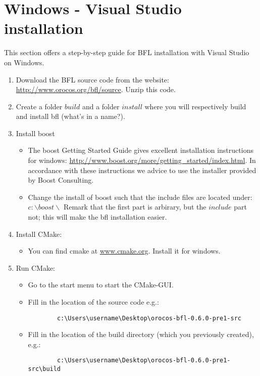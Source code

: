 \documentclass[a4paper,10pt]{article}
\begin{document}
\section{Windows - Visual Studio installation}
\label{sec:windows}
This section offers a step-by-step guide for BFL installation with Visual Studio on Windows.

\begin{enumerate}
\item Download the BFL source code from the website: 
\url{http://www.orocos.org/bfl/source}. Unzip this code.
\item Create a folder $build$ and a folder $install$ where you will respectively build and install bfl (what's in a name?).
 \item Install boost
 	\begin{itemize}
 	 \item The boost Getting Started Guide gives excellent installation instructions for windows: \url{http://www.boost.org/more/getting_started/index.html}. In accordance with these instructions we advice to use the installer provided by Boost Consulting.
 	 \item Change the install of boost such that the include files are located under: $ c:\backslash boost \backslash$
 	 Remark that the first part is arbirary, but the $include$ part not; this will make the bfl installation easier.
 	\end{itemize}
\item Install CMake:
	\begin{itemize}
	\item You can find cmake at  \url{www.cmake.org}. Install it for windows.
	\end{itemize}
\item Run CMake:
	\begin{itemize}
	 \item Go to the start menu to start the CMake-GUI.
	 \item Fill in the location of the source code e.g.:
	 	\begin{verbatim}
	 	c:\Users\username\Desktop\orocos-bfl-0.6.0-pre1-src
	 	\end{verbatim}
	\item Fill in the location of the build directory (which you previously created), e.g.:
		\begin{verbatim}
	 	c:\Users\username\Desktop\orocos-bfl-0.6.0-pre1-src\build
		\end{verbatim}

\end{itemize}
\end{enumerate}
\end{document}
